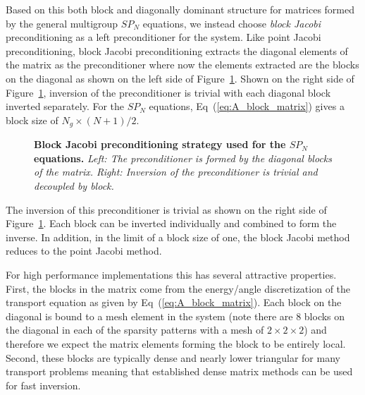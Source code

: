 Based on this both block and diagonally dominant structure for
matrices formed by the general multigroup $SP_N$ equations, we instead
choose \textit{block Jacobi} preconditioning as a left preconditioner
for the system. Like point Jacobi preconditioning, block Jacobi
preconditioning extracts the diagonal elements of the matrix as the
preconditioner where now the elements extracted are the blocks on the
diagonal as shown on the left side of
Figure~\ref{fig:block_jacobi_ex}. Shown on the right side of
Figure~\ref{fig:block_jacobi_ex}, inversion of the preconditioner is
trivial with each diagonal block inverted separately. For the $SP_N$
equations, Eq~(\ref{eq:A_block_matrix}) gives a block size of
$N_g\times(N+1)/2$.
\begin{figure}[t!]
  \begin{center}
    \scalebox{1.5}{
     }
  \end{center}
  \caption{\textbf{Block Jacobi preconditioning strategy used for the
      $SP_N$ equations.} \textit{Left: The preconditioner is formed by
      the diagonal blocks of the matrix. Right: Inversion of the
      preconditioner is trivial and decoupled by block.}}
  \label{fig:block_jacobi_ex}
\end{figure}
The inversion of this preconditioner is trivial as shown on the right
side of Figure~\ref{fig:block_jacobi_ex}. Each block can be inverted
individually and combined to form the inverse. In addition, in the
limit of a block size of one, the block Jacobi method reduces to the
point Jacobi method. 

For high performance implementations this has several attractive
properties. First, the blocks in the matrix come from the energy/angle
discretization of the transport equation as given by
Eq~(\ref{eq:A_block_matrix}). Each block on the diagonal is bound to a
mesh element in the system (note there are 8 blocks on the diagonal in
each of the sparsity patterns with a mesh of $2 \times 2 \times 2$)
and therefore we expect the matrix elements forming the block to be
entirely local. Second, these blocks are typically dense and nearly
lower triangular for many transport problems meaning that established
dense matrix methods can be used for fast inversion.

